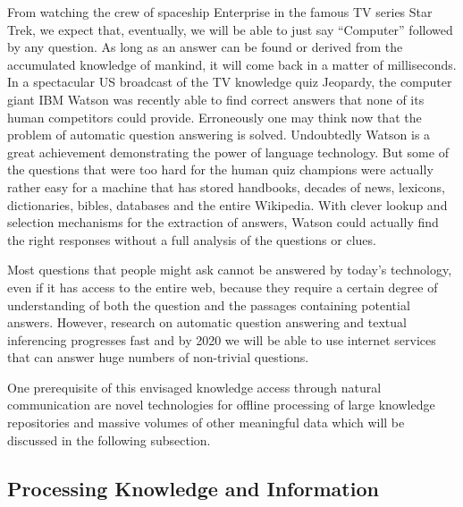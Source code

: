 \begin{multicols}{2}
From watching the crew of spaceship Enterprise in the famous TV series Star Trek, we expect that, eventually, we will be able to just say “Computer” followed by any question. As long as an answer can be found or derived from the accumulated knowledge of mankind, it will come back in a matter of milliseconds. In a spectacular US broadcast of the TV knowledge quiz Jeopardy, the computer giant IBM Watson was recently able to find correct answers that none of its human competitors could provide. Erroneously one may think now that the problem of automatic question answering is solved. Undoubtedly Watson is a great achievement demonstrating the power of language technology. But some of the questions that were too hard for the human quiz champions were actually rather easy for a machine that has stored handbooks, decades of news, lexicons, dictionaries, bibles, databases and the entire Wikipedia. With clever lookup and selection mechanisms for the extraction of answers, Watson could actually find the right responses without a full analysis of the questions or clues.
 
Most questions that people might ask cannot be answered by today’s technology, even if it has access to the entire web, because they require a certain degree of understanding of both the question and the passages containing potential answers. However, research on automatic question answering and textual inferencing progresses fast and by 2020 we will be able to use internet services that can answer huge numbers of non-trivial questions.
 
One prerequisite of this envisaged knowledge access through natural communication are novel technologies for offline processing of large knowledge repositories and massive volumes of other meaningful data which will be discussed in the following subsection.  

\subsection{Processing Knowledge and Information}
\label{sec:proc-knowl-inform}


\end{multicols}
